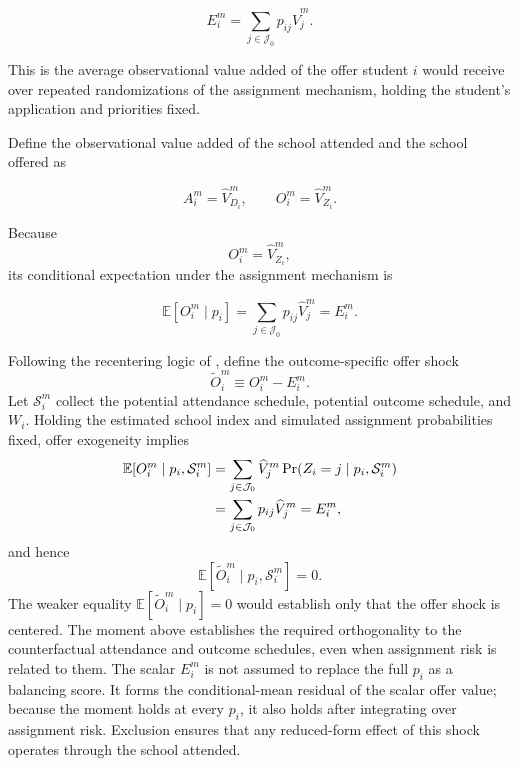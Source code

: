 \documentclass[a4paper, article, english, oneside, unknownkeysallowed, 12pt]{memoir}
\begin{document}
\begin{equation}
    E_i^m
    =
    \sum_{j\in\mathcal J_0}p_{ij}\widehat V_j^m.
    \label{eq:expected-va}
\end{equation}

This is the average observational value added of the offer student $i$ would receive over
repeated randomizations of the assignment mechanism, holding the student's application
and priorities fixed.

Define the observational value added of the school attended and the school offered as

\begin{equation}
    A_i^m
    =
    \widehat V_{D_i}^m,
    \qquad
    O_i^m
    =
    \widehat V_{Z_i}^m.
    \label{eq:attended-offered-va}
\end{equation}

Because
\[
    O_i^m=\widehat V_{Z_i}^m,
\]
its conditional expectation under the assignment mechanism is

\begin{equation}
    \mathbb E[O_i^m\mid p_i]
    =
    \sum_{j\in\mathcal J_0}p_{ij}\widehat V_j^m
    =
    E_i^m.
    \label{eq:offer-expectation}
\end{equation}

Following the recentering logic of \textcite{borusyak_nonrandom_2023}, define the
outcome-specific offer shock
\begin{equation}
    \widetilde O_i^m
    \equiv
    O_i^m-E_i^m.
    \label{eq:offer-shock}
\end{equation}
Let $\mathcal S_i^m$ collect the potential attendance schedule, potential outcome schedule,
and $W_i$. Holding the estimated school index and simulated assignment probabilities fixed,
offer exogeneity implies
\begin{align}
    \mathbb E[O_i^m\mid p_i,\mathcal S_i^m]
    &=
    \sum_{j\in\mathcal J_0}\widehat V_j^m
    \Pr(Z_i=j\mid p_i,\mathcal S_i^m) \notag\\
    &=
    \sum_{j\in\mathcal J_0}p_{ij}\widehat V_j^m
    =E_i^m,
    \label{eq:offer-exogeneity-moment}
\end{align}
and hence
\[
    \mathbb E[\widetilde O_i^m\mid p_i,\mathcal S_i^m]=0.
\]
The weaker equality $\mathbb E[\widetilde O_i^m\mid p_i]=0$ would establish only that the
offer shock is centered. The moment above establishes the required orthogonality to the
counterfactual attendance and outcome schedules, even when assignment risk is related to
them. The scalar $E_i^m$ is not assumed to replace the full $p_i$ as a balancing score.
It forms the conditional-mean residual of the scalar offer value; because the moment holds
at every $p_i$, it also holds after integrating over assignment risk. Exclusion ensures that
any reduced-form effect of this shock operates through the school attended.
\end{document}
